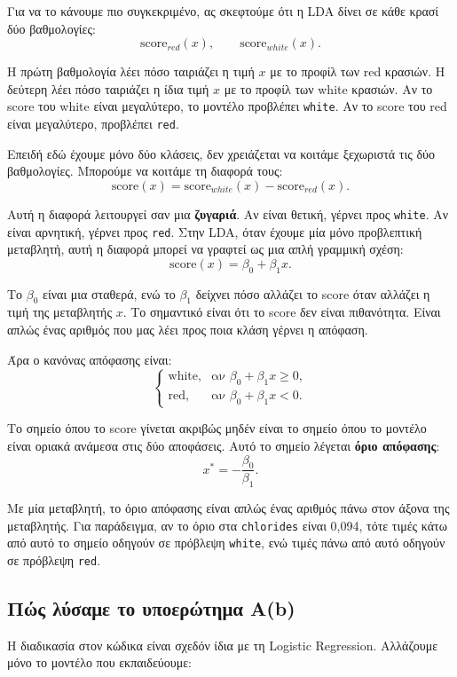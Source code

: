 \documentclass[11pt,a4paper]{article}
\newcommand{\code}[1]{\texttt{#1}}
\begin{document}
Για να το κάνουμε πιο συγκεκριμένο, ας σκεφτούμε ότι η LDA δίνει σε κάθε
κρασί δύο βαθμολογίες:
\[
\text{score}_{red}(x), \qquad \text{score}_{white}(x).
\]

Η πρώτη βαθμολογία λέει πόσο ταιριάζει η τιμή \(x\) με το προφίλ των red
κρασιών. Η δεύτερη λέει πόσο ταιριάζει η ίδια τιμή \(x\) με το προφίλ των
white κρασιών. Αν το score του white είναι μεγαλύτερο, το μοντέλο προβλέπει
\code{white}. Αν το score του red είναι μεγαλύτερο, προβλέπει \code{red}.

Επειδή εδώ έχουμε μόνο δύο κλάσεις, δεν χρειάζεται να κοιτάμε ξεχωριστά τις
δύο βαθμολογίες. Μπορούμε να κοιτάμε τη διαφορά τους:
\[
\text{score}(x) =
\text{score}_{white}(x) - \text{score}_{red}(x).
\]

Αυτή η διαφορά λειτουργεί σαν μια \textbf{ζυγαριά}. Αν είναι θετική, γέρνει
προς \code{white}. Αν είναι αρνητική, γέρνει προς \code{red}. Στην LDA, όταν
έχουμε μία μόνο προβλεπτική μεταβλητή, αυτή η διαφορά μπορεί να γραφτεί ως
μια απλή γραμμική σχέση:
\[
\text{score}(x) = \beta_0 + \beta_1 x.
\]

Το \(\beta_0\) είναι μια σταθερά, ενώ το \(\beta_1\) δείχνει πόσο αλλάζει το
score όταν αλλάζει η τιμή της μεταβλητής \(x\). Το σημαντικό είναι ότι το
score δεν είναι πιθανότητα. Είναι απλώς ένας αριθμός που μας λέει προς ποια
κλάση γέρνει η απόφαση.

Άρα ο κανόνας απόφασης είναι:
\[
\begin{cases}
\text{white}, & \text{αν } \beta_0 + \beta_1 x \ge 0,\\
\text{red}, & \text{αν } \beta_0 + \beta_1 x < 0.
\end{cases}
\]

Το σημείο όπου το score γίνεται ακριβώς μηδέν είναι το σημείο όπου το μοντέλο
είναι οριακά ανάμεσα στις δύο αποφάσεις. Αυτό το σημείο λέγεται
\textbf{όριο απόφασης}:
\[
x^* = -\frac{\beta_0}{\beta_1}.
\]

Με μία μεταβλητή, το όριο απόφασης είναι απλώς ένας αριθμός πάνω στον άξονα
της μεταβλητής. Για παράδειγμα, αν το όριο στα \code{chlorides} είναι
0,094, τότε τιμές κάτω από αυτό το σημείο οδηγούν σε πρόβλεψη \code{white},
ενώ τιμές πάνω από αυτό οδηγούν σε πρόβλεψη \code{red}.

\subsection{Πώς λύσαμε το υποερώτημα Α(b)}

Η διαδικασία στον κώδικα είναι σχεδόν ίδια με τη Logistic Regression.
Αλλάζουμε μόνο το μοντέλο που εκπαιδεύουμε:
\end{document}
